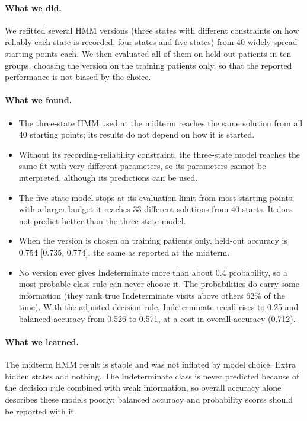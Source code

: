 \documentclass[11pt,a4paper]{article}
\begin{document}
\paragraph{What we did.} We refitted several HMM versions (three states with
different constraints on how reliably each state is recorded, four states and
five states) from 40 widely spread starting points each. We then evaluated all
of them on held-out patients in ten groups, choosing the version on the training
patients only, so that the reported performance is not biased by the choice.

\paragraph{What we found.}

\begin{itemize}
  \item The three-state HMM used at the midterm reaches the same solution from
        all 40 starting points; its results do not depend on how it is started.
  \item Without its recording-reliability constraint, the three-state model
        reaches the same fit with very different parameters, so its parameters
        cannot be interpreted, although its predictions can be used.
  \item The five-state model stops at its evaluation limit from most starting
        points; with a larger budget it reaches 33 different solutions from 40
        starts. It does not predict better than the three-state model.
  \item When the version is chosen on training patients only, held-out accuracy
        is 0.754 [0.735, 0.774], the same as reported at the midterm.
  \item No version ever gives Indeterminate more than about 0.4
        probability,
        so a most-probable-class rule can never choose it. The probabilities do
        carry some information (they rank true Indeterminate visits above
        others 62\% of the time). With the adjusted decision rule, Indeterminate
        recall rises to 0.25 and balanced accuracy from 0.526 to 0.571, at a
        cost in overall accuracy (0.712).
\end{itemize}

\paragraph{What we learned.} The midterm HMM result is stable and was not
inflated by model choice. Extra hidden states add nothing. The Indeterminate
class is never predicted because of the decision rule combined with weak
information, so overall accuracy alone describes these models poorly; balanced
accuracy and probability scores should be reported with it.
\end{document}
